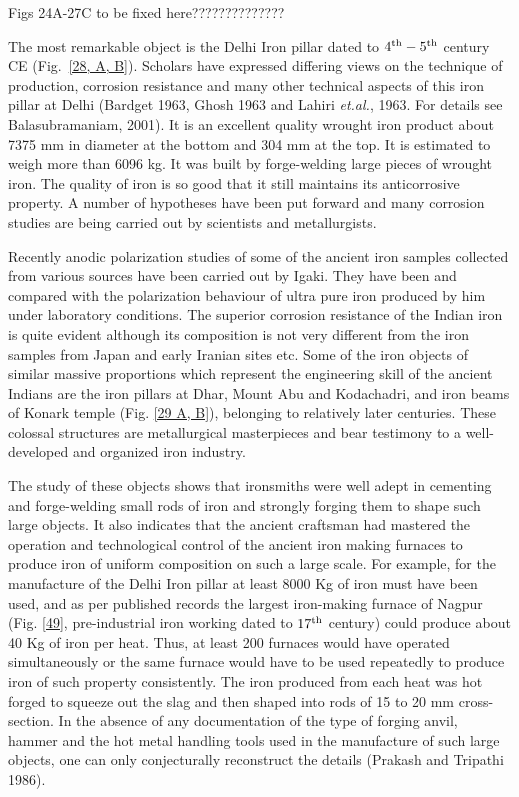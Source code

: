 Figs 24A-27C to be fixed here??????????????


The most remarkable object is the Delhi Iron pillar dated to $4^{\rm th} -5^{\rm th}$ century CE (Fig.~\ref{28, A, B}). Scholars have expressed differing views on the technique of production, corrosion resistance and many other technical aspects of this iron pillar at Delhi (Bardget 1963, Ghosh 1963 and Lahiri {\it et.al.}, 1963. For details see Balasubramaniam, 2001). It is an excellent quality wrought iron product about 7375 mm in diameter at the bottom and 304 mm at the top. It is estimated to weigh more than 6096 kg. It was built by forge-welding large pieces of wrought iron. The quality of iron is so good that it still maintains its anticorrosive property. A number of hypotheses have been put forward and many corrosion studies are being carried out by scientists and metallurgists. 

Recently anodic polarization studies of some of the ancient iron samples collected from various sources have been carried out by Igaki. They have been and compared with the polarization behaviour of ultra pure iron produced by him under laboratory conditions. The superior corrosion resistance of the Indian iron is quite evident although its composition is not very different from the iron samples from Japan and early Iranian sites etc. Some of the iron objects of similar massive proportions which represent the engineering skill of the ancient Indians are the iron pillars at Dhar, Mount Abu and Kodachadri, and iron beams of Konark temple (Fig. \ref{29 A, B}), belonging to relatively later centuries. These colossal structures are metallurgical masterpieces and bear testimony to a well-developed and organized iron industry.

The study of these objects shows that ironsmiths were well adept in cementing and forge-welding small rods of iron and strongly forging them to shape such large objects. It also indicates that the ancient craftsman had mastered the operation and technological control of the ancient iron making furnaces to produce iron of uniform composition on such a large scale. For example, for the manufacture of the Delhi Iron pillar at least 8000 Kg of iron must have been used, and as per published records the largest iron-making furnace of Nagpur (Fig. \ref{49}, pre-industrial iron working dated to $17^{\rm th}$ century) could produce about 40 Kg of iron per heat. Thus, at least 200 furnaces would have operated simultaneously or the same furnace would have to be used repeatedly to produce iron of such property consistently. The iron produced from each heat was hot forged to squeeze out the slag and then shaped into rods of 15 to 20 mm cross-section. In the absence of any documentation of the type of forging anvil, hammer and the hot metal handling tools used in the manufacture of such large objects, one can only conjecturally reconstruct the details (Prakash and Tripathi 1986). 

